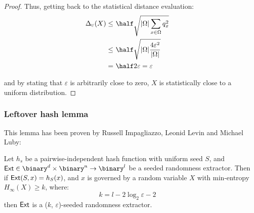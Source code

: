 \begin{proof}
    Thus, getting back to the statistical distance evaluation:
    \begin{align*}
        \sdtu(X) \leq&\ \half \sqrt{|\Omega| \sum_{x \in \Omega} q_x^2}        \\
                 \leq&\ \half \sqrt{|\Omega| \frac{4 \varepsilon^2}{|\Omega|}} \\
                    =&\ \half 2 \varepsilon = \varepsilon                      \\
    \end{align*}

    and by stating that $\varepsilon$ is arbitrarily close to zero, $X$ is statistically close to a uniform distribution.
\end{proof}

\subsubsection{Leftover hash lemma}

This lemma has been proven by Russell Impagliazzo, Leonid Levin and Michael Luby:

\begin{lemma}
    Let $h_s$ be a pairwise-independent hash function with uniform seed $S$, and $\ext \in \binary^d \times \binary^n \to \binary^l$ be a seeded randomness extractor. Then if $\textup{\textsf{Ext}}(S, x) = h_S(x)$, and $x$ is governed by a random variable $X$ with min-entropy $H_{\infty}(X) \geq k$, where:
    \[
       k = l - 2 \log_2 \varepsilon - 2
    \]
    then $\textup{\textsf{Ext}}$ is a ($k$, $\varepsilon$)-seeded randomness extractor.
\end{lemma}


